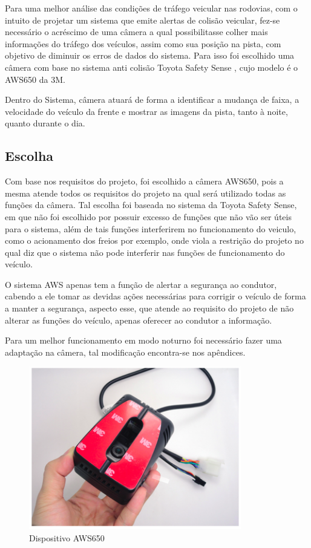 Para uma melhor análise das condições de tráfego veicular nas rodovias, com o intuito de projetar um sistema que emite alertas de colisão veicular, fez-se necessário o acréscimo de uma câmera a qual possibilitasse colher mais informações do tráfego dos veículos, assim como sua posição na pista, com objetivo de diminuir os erros de dados do sistema. Para isso foi escolhido uma câmera com base no sistema anti colisão  Toyota Safety Sense , cujo modelo é o AWS650 da 3M.

Dentro do Sistema, câmera atuará de forma a identificar a mudança de faixa, a velocidade do veículo da frente e mostrar as imagens da pista, tanto à noite, quanto durante o dia.

\subsection{Escolha}

Com base nos requisitos do projeto, foi escolhido a câmera AWS650, pois a mesma atende todos os requisitos do projeto na qual será utilizado todas as funções da câmera. Tal escolha foi baseada no sistema da Toyota Safety Sense, em que não foi escolhido por possuir excesso de funções que não vão ser úteis para o sistema, além de tais funções interferirem no funcionamento do veiculo, como o acionamento dos freios  por exemplo,  onde viola a restrição do projeto no qual diz que o sistema não pode interferir nas funções de funcionamento do veículo.

O sistema AWS apenas tem a função de alertar a segurança ao condutor, cabendo a ele tomar as devidas ações necessárias para corrigir o veículo de forma a manter a segurança, aspecto esse, que atende ao requisito do projeto de não alterar as funções do veículo, apenas oferecer ao condutor a informação.
	
Para um melhor funcionamento em modo noturno foi necessário fazer uma adaptação na câmera, tal modificação encontra-se nos apêndices.

\begin{figure}[h]
  \centering
  \includegraphics[width=350px, scale=1]{figuras/sensoraws650}
  \caption{Dispositivo AWS650}
\label{fig:sensoraws650}
\end{figure}

